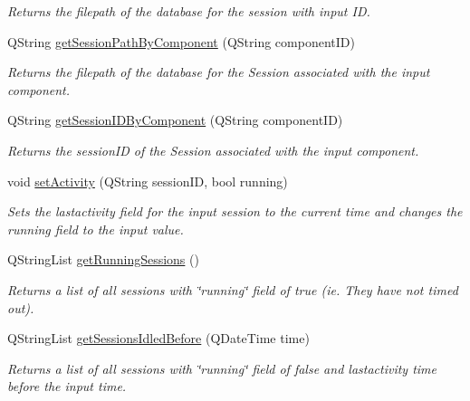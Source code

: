 \begin{DoxyCompactItemize}
\begin{DoxyCompactList}\small\item\em Returns the filepath of the database for the session with input I\-D. \end{DoxyCompactList}\item 
\hypertarget{class_server_config_a868a40ae84ee613f8cc464a74216163a}{Q\-String \hyperlink{class_server_config_a868a40ae84ee613f8cc464a74216163a}{get\-Session\-Path\-By\-Component} (Q\-String component\-I\-D)}\label{class_server_config_a868a40ae84ee613f8cc464a74216163a}

\begin{DoxyCompactList}\small\item\em Returns the filepath of the database for the Session associated with the input component. \end{DoxyCompactList}\item 
\hypertarget{class_server_config_a4cbe4938f0593b69debed87c2e744699}{Q\-String \hyperlink{class_server_config_a4cbe4938f0593b69debed87c2e744699}{get\-Session\-I\-D\-By\-Component} (Q\-String component\-I\-D)}\label{class_server_config_a4cbe4938f0593b69debed87c2e744699}

\begin{DoxyCompactList}\small\item\em Returns the session\-I\-D of the Session associated with the input component. \end{DoxyCompactList}\item 
void \hyperlink{class_server_config_a5169a1d3ba39ad1f64998d6d1a9eb3a1}{set\-Activity} (Q\-String session\-I\-D, bool running)
\begin{DoxyCompactList}\small\item\em Sets the lastactivity field for the input session to the current time and changes the running field to the input value. \end{DoxyCompactList}\item 
\hypertarget{class_server_config_a35c54a2cbfd98f53105ee36d4176663e}{Q\-String\-List \hyperlink{class_server_config_a35c54a2cbfd98f53105ee36d4176663e}{get\-Running\-Sessions} ()}\label{class_server_config_a35c54a2cbfd98f53105ee36d4176663e}

\begin{DoxyCompactList}\small\item\em Returns a list of all sessions with \char`\"{}running\char`\"{} field of true (ie. They have not timed out). \end{DoxyCompactList}\item 
Q\-String\-List \hyperlink{class_server_config_a99f5a212ba07712ad3e7f109c4c0325b}{get\-Sessions\-Idled\-Before} (Q\-Date\-Time time)
\begin{DoxyCompactList}\small\item\em Returns a list of all sessions with \char`\"{}running\char`\"{} field of false and lastactivity time before the input time. \end{DoxyCompactList}\end{DoxyCompactItemize}


